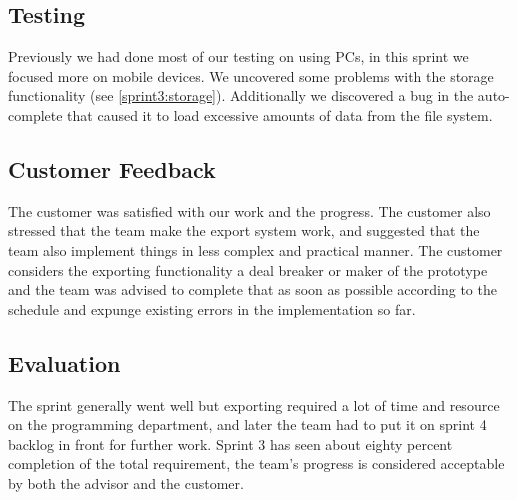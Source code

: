 \subsection{Testing}

Previously we had done most of our testing on using PCs, in this sprint we
focused more on mobile devices. We uncovered some problems with the
storage functionality (see \ref{sprint3:storage}). Additionally we discovered
a bug in the auto-complete that caused it to load excessive amounts of data from
the file system.

\subsection{Customer Feedback}

The customer was satisfied with our work and the progress. The customer
also stressed that the team make the export system work, and suggested that
the team also implement things in less complex and practical manner. The
customer considers the exporting functionality a deal breaker or maker of
the prototype and the team was advised to complete that as soon as possible
according to the schedule and expunge existing errors in the implementation
so far.

\subsection{Evaluation}

The sprint generally went well but exporting required a lot of time and
resource on the programming department, and later the team had to put it on
sprint 4 backlog in front for further work. Sprint 3 has seen about eighty
percent completion of the total requirement, the team's progress is considered
acceptable by both the advisor and the customer. 
